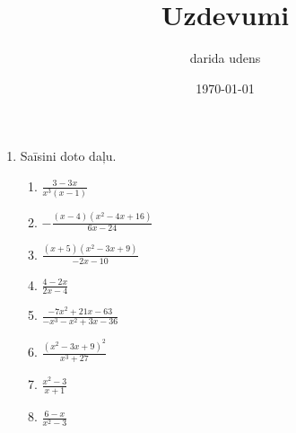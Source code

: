 \documentclass[12pt]{article}
\author{darida udens}
\date{\today}
\title{Uzdevumi}
\begin{document}
    \maketitle
    \begin{enumerate}
        \item Saīsini doto daļu.
    \begin{enumerate}
        \item $\frac{3 - 3 x}{x^{3} \left(x - 1\right)}$
        \item $- \frac{\left(x - 4\right) \left(x^{2} - 4 x + 16\right)}{6 x - 24}$
        \item $\frac{\left(x + 5\right) \left(x^{2} - 3 x + 9\right)}{- 2 x - 10}$
        \item $\frac{4 - 2 x}{2 x - 4}$
        \item $\frac{- 7 x^{2} + 21 x - 63}{- x^{3} - x^{2} + 3 x - 36}$
        \item $\frac{\left(x^{2} - 3 x + 9\right)^{2}}{x^{3} + 27}$
        \item $\frac{x^{2} - 3}{x + 1}$
        \item $\frac{6 - x}{x^{2} - 3}$
    \end{enumerate}

	\end{enumerate}
\end{document}
